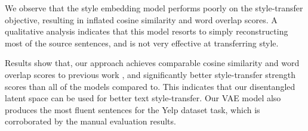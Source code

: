 \documentclass[letterpaper]{article} %
\begin{document}
We observe that the style embedding model \cite{fu2017style} performs poorly on the style-transfer objective, resulting in inflated cosine similarity and word overlap scores.
A qualitative analysis indicates that this model resorts to simply reconstructing most of the source sentences, and is not very effective at transferring style.

Results show that, our approach achieves comparable cosine similarity and word overlap scores to previous work \cite{shen2017style,zhao2018adversarially}, and significantly better style-transfer strength scores than all of the models compared to. This indicates that our disentangled latent space can be used for better text style-transfer.
Our VAE model also produces the most fluent sentences for the Yelp dataset task, which is corroborated by the manual evaluation results.
\end{document}
